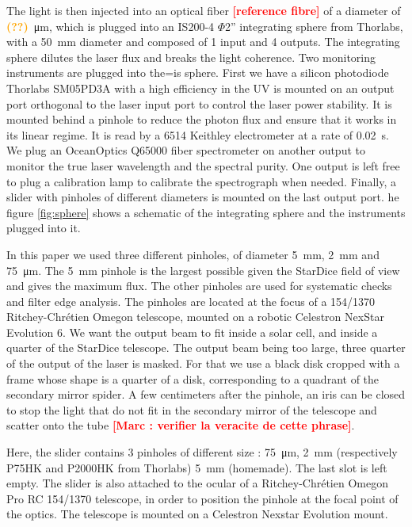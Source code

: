 \documentclass[onecolumn]{aa}
\newcommand{\SD}{StarDice }
\newcommand{\todo}[1]{\textbf{\textcolor{red}{[#1]}}\xspace}
\newcommand{\com}[1]{\textbf{\textcolor{orange}{(#1)}}\xspace}
\begin{document}
The light is then injected into an optical fiber \todo{reference fibre} of a diameter of \com{??}\SI{}{\micro\meter}, which is plugged into an IS200-4 $\Phi$2'' integrating sphere from Thorlabs, with a \SI{50}{\mm} diameter and composed of 1 input and 4 outputs. The integrating sphere dilutes the laser flux and breaks the light coherence. Two monitoring instruments are plugged into the=is sphere. First we have a silicon photodiode Thorlabs SM05PD3A with a high efficiency in the UV is mounted on an output port orthogonal to the laser input port to control the laser power stability. It is mounted behind a pinhole to reduce the photon flux and ensure that it works in its linear regime. It is read by a 6514 Keithley electrometer at a rate of \SI{0.02}{\second}. We plug an OceanOptics Q65000 fiber spectrometer on another output to monitor the true laser wavelength and the spectral purity. One output is left free to plug a calibration lamp to calibrate the spectrograph when needed. Finally, a slider with pinholes of different diameters is mounted on the last output port. he figure \ref{fig:sphere} shows a schematic of the integrating sphere and the instruments plugged into it.

In this paper we used three different pinholes, of diameter \SI{5}{\mm}, \SI{2}{\mm} and \SI{75}{\um}. The \SI{5}{\mm} pinhole is the largest possible given the \SD field of view and gives the maximum flux. The other pinholes are used for systematic checks and filter edge analysis. The pinholes are located at the focus of a 154/1370 Ritchey-Chrétien Omegon telescope, mounted on a robotic Celestron NexStar Evolution 6. We want the output beam to fit inside a solar cell, and inside a quarter of the \SD telescope. The output beam being too large, three quarter of the output of the laser is masked. For that we use a black disk cropped with a frame whose shape is a quarter of a disk, corresponding to a quadrant of the secondary mirror spider. A few centimeters after the pinhole, an iris can be closed to stop the light that do not fit in the secondary mirror of the telescope and scatter onto the tube \todo{Marc : verifier la veracite de cette phrase}.

\noindent Here, the slider contains 3 pinholes of different size : \SI{75}{\micro\meter}, \SI{2}{\milli\meter} (respectively P75HK and P2000HK from Thorlabs) \SI{5}{\milli\meter} (homemade). The last slot is left empty. The slider is also attached to the ocular of a Ritchey-Chrétien Omegon Pro RC 154/1370 telescope, in order to position the pinhole at the focal point of the optics. The telescope is mounted on a Celestron Nexstar Evolution mount.  \\
\end{document}
